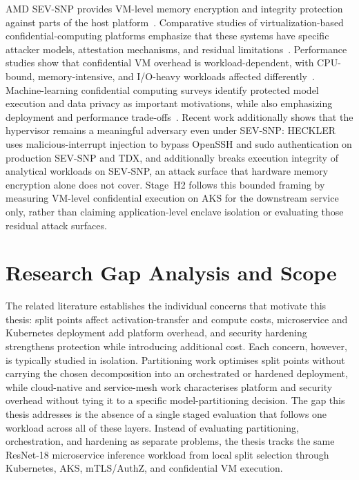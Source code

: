 AMD SEV-SNP provides VM-level memory encryption and integrity protection against
parts of the host platform~\cite{amd_sevsnp_whitepaper,kaplan2023_hardware_vm}.
Comparative studies of virtualization-based confidential-computing platforms
emphasize that these systems have specific attacker models, attestation
mechanisms, and residual limitations~\cite{guanciale2022_confidential_quartet,misono2024_cvm_explained}.
Performance studies show that confidential VM overhead is workload-dependent,
with CPU-bound, memory-intensive, and I/O-heavy workloads affected
differently~\cite{misono2024_cvm_explained,akram2021_hpc_tees}. Machine-learning
confidential computing surveys identify protected model execution and data
privacy as important motivations, while also emphasizing deployment and
performance trade-offs~\cite{mo2024_ml_confidential_computing}. Recent work
additionally shows that the hypervisor remains a meaningful adversary even
under SEV-SNP: HECKLER~\cite{schluter2024_heckler} uses malicious-interrupt
injection to bypass OpenSSH and sudo authentication on production SEV-SNP
and TDX, and additionally breaks execution integrity of analytical
workloads on SEV-SNP, an attack surface that hardware memory encryption
alone does not cover. Stage~H2 follows this bounded framing by
measuring VM-level confidential execution on AKS for the downstream service
only, rather than claiming application-level enclave isolation or evaluating
those residual attack surfaces.

\section{Research Gap Analysis and Scope}
\label{sec:rw-positioning}

The related literature establishes the individual concerns that motivate this thesis:
split points affect activation-transfer and compute costs, microservice and Kubernetes
deployment add platform overhead, and security hardening strengthens protection while
introducing additional cost. Each concern, however, is typically studied in isolation.
Partitioning work optimises split points without carrying the chosen decomposition into
an orchestrated or hardened deployment, while cloud-native and service-mesh work
characterises platform and security overhead without tying it to a specific
model-partitioning decision. The gap this thesis addresses is the absence of a single
staged evaluation that follows one workload across all of these layers. Instead of
evaluating partitioning, orchestration, and hardening as separate problems, the thesis
tracks the same ResNet-18 microservice inference workload from local split selection
through Kubernetes, AKS, mTLS/AuthZ, and confidential VM execution.

